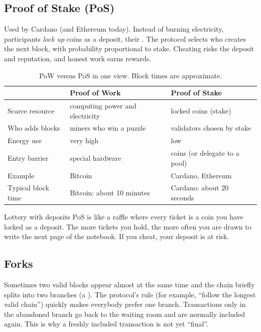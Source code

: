 \subsection{Proof of Stake (PoS)}
Used by Cardano (and Ethereum today). Instead of burning electricity, participants \emph{lock up} coins as a deposit, their . The protocol selects who creates the next block, with probability proportional to stake. Cheating risks the deposit and reputation, and honest work earns rewards.

\begin{table}[h]
\centering
\small
\begin{tabular}{@{}p{3.2cm}p{5.6cm}p{5.6cm}@{}}
\toprule
 & \textbf{Proof of Work} & \textbf{Proof of Stake}\\
\midrule
Scarce resource & computing power and electricity & locked coins (stake)\\
Who adds blocks & miners who win a puzzle & validators chosen by stake\\
Energy use & very high & low\\
Entry barrier & special hardware & coins (or delegate to a pool)\\
Example & Bitcoin & Cardano, Ethereum\\
Typical block time & Bitcoin: about 10 minutes & Cardano: about 20 seconds\\
\bottomrule
\end{tabular}
\caption{PoW versus PoS in one view. Block times are approximate.}
\end{table}

\begin{analogybox}{Lottery with deposits}
PoS is like a raffle where every ticket is a coin you have locked as a deposit. The more tickets you hold, the more often you are drawn to write the next page of the notebook. If you cheat, your deposit is at risk.
\end{analogybox}

\subsection{Forks}
Sometimes two valid blocks appear almost at the same time and the chain briefly splits into two branches (a ). The protocol's rule (for example, ``follow the longest valid chain'') quickly makes everybody prefer one branch. Transactions only in the abandoned branch go back to the waiting room and are normally included again. This is why a freshly included transaction is not yet ``final''.

